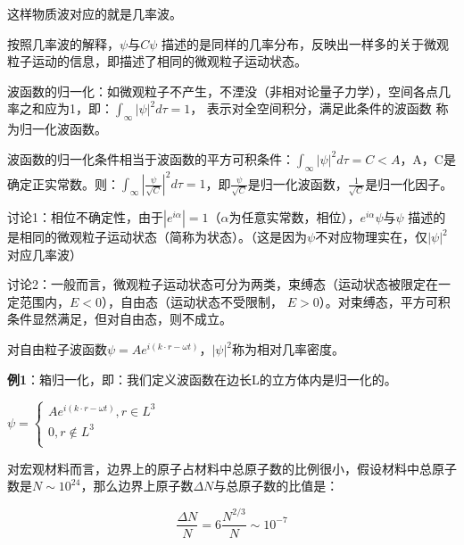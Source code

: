 这样物质波对应的就是几率波。

按照几率波的解释，$\psi $与$C\psi $
描述的是同样的几率分布，反映出一样多的关于微观粒子运动的信息，即描述了相同的微观粒子运动状态。


波函数的归一化：如微观粒子不产生，不湮没（非相对论量子力学），空间各点几率之和应为1，即：$\int_\infty  {\left| \psi  \right|^2 d\tau }  = 1$， 表示对全空间积分，满足此条件的波函数 称为归一化波函数。


波函数的归一化条件相当于波函数的平方可积条件：$\int_\infty  {\left| \psi  \right|^2 d\tau }  = C < A$，A，C是确定正实常数。则：$\int_\infty  {\left| {\frac{\psi }{{\sqrt C }}} \right|^2 d\tau  = 1} $，即$\frac{\psi }{{\sqrt C }}$是归一化波函数，$\frac{1}{{\sqrt C }}$是归一化因子。

讨论1：相位不确定性，由于$\left| {e^{i\alpha } } \right| = 1$（$\alpha$为任意实常数，相位），$e^{i\alpha } \psi $与$\psi$ 描述的是相同的微观粒子运动状态（简称为状态）。（这是因为$\psi$不对应物理实在，仅$\left| \psi  \right|^2 $对应几率波）

讨论2：一般而言，微观粒子运动状态可分为两类，束缚态（运动状态被限定在一定范围内，$E < 0$），自由态（运动状态不受限制， $E > 0$）。对束缚态，平方可积条件显然满足，但对自由态，则不成立。



对自由粒子波函数$\psi  = Ae^{i(k \cdot r - \omega t)} $，$\left| \psi  \right|^2 $称为相对几率密度。

\textbf{例1}：箱归一化，即：我们定义波函数在边长L的立方体内是归一化的。



\begin{center}
$\psi  = \left\{ \begin{array}{l}
 Ae^{i(k \cdot r - \omega t)} ,r \in L^3  \\
 0,r \notin L^3  \\
 \end{array} \right.$
\end{center}

对宏观材料而言，边界上的原子占材料中总原子数的比例很小，假设材料中总原子数是$N \sim  10^{24}$，那么边界上原子数$\Delta N$与总原子数的比值是：

\begin{equation}
\frac{\Delta N}{N} = 6 \frac{N^{2/3}}{N}  \sim  10^{-7} 
\end{equation}

